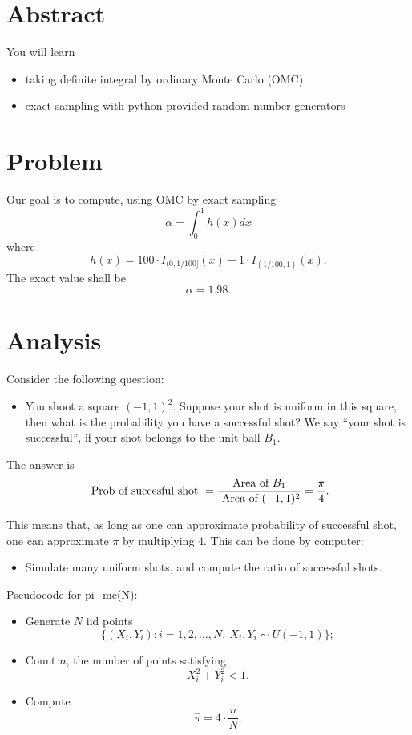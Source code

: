 \documentclass{article}
\begin{document}
\section{Abstract}
You will learn
\begin{itemize}
 \item taking definite integral by ordinary Monte Carlo (OMC)
 \item exact sampling with python provided random number generators
\end{itemize}

\section{Problem}
Our goal is to compute, using OMC by exact sampling
$$\alpha = \int_0^1 h(x) dx$$
where
$$h(x) = 100 \cdot I_{(0, 1/100]}(x) + 1\cdot I_{(1/100, 1)} (x).$$
The exact value shall be 
$$\alpha = 1.98.$$

\section{Analysis}



Consider the following question:

\begin{itemize}
 \item You shoot a square $(-1, 1)^{2}$. Suppose your shot is uniform in this square, then what is the probability you have a successful shot? We say
 ``your shot is successful'', if your shot belongs to the unit ball $B_{1}$.
\end{itemize}

The answer is 
$$\hbox{ Prob of succesful shot } = \frac{\hbox{Area of  }B_{1}} { \hbox{ Area of }(-1, 1)^{2}} = \frac{\pi}{4} .$$


This means that, as long as one can approximate probability of successful shot, one can approximate $\pi$ by multiplying $4$. This can be done by computer: 
\begin{itemize}
\item Simulate many uniform shots, and compute the ratio of successful shots.
\end{itemize}


Pseudocode for pi\_mc(N):
\begin{itemize}
\item Generate $N$ iid points $$\{(X_i, Y_i): i = 1, 2, \ldots, N, \ X_i, Y_i \sim U(-1,1)\};$$
\item Count $n$, the number of points satisfying
$$X_i^2 + Y_i^2 <1.$$
\item Compute 
$$\hat \pi = 4 \cdot \frac{n}{N}.$$
\end{itemize}
\end{document}
